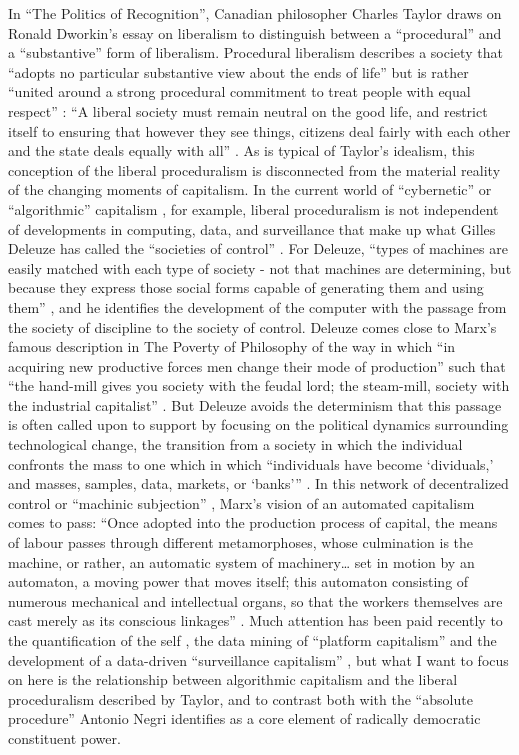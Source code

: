 \documentclass[12pt,oneside]{memoir}
\begin{document}
In ``The Politics of Recognition'', Canadian philosopher Charles Taylor draws on Ronald Dworkin's essay on liberalism to distinguish between a ``procedural'' and a ``substantive'' form of liberalism. Procedural liberalism describes a society that ``adopts no particular substantive view about the ends of life'' but is rather ``united around a strong procedural commitment to treat people with equal respect'' \cite[56]{Taylor1994}: ``A liberal society must remain neutral on the good life, and restrict itself to ensuring that however they see things, citizens deal fairly with each other and the state deals equally with all'' \citep[57]{Taylor1994}. As is typical of Taylor's idealism, this conception of the liberal proceduralism is disconnected from the material reality of the changing moments of capitalism. In the current world of ``cybernetic'' or ``algorithmic'' capitalism \citep{DyerWitheford2015, Parisi2015}, for example, liberal proceduralism is not independent of developments in computing, data, and surveillance that make up what Gilles Deleuze has called the ``societies of control'' \citep{Deleuze1992}. For Deleuze, ``types of machines are easily matched with each type of society - not that machines are determining, but because they express those social forms capable of generating them and using them'' \citep[6]{Deleuze1992}, and he identifies the development of the computer with the passage from the society of discipline to the society of control. Deleuze comes close to Marx's famous description in The Poverty of Philosophy of the way in which ``in acquiring new productive forces men change their mode of production'' such that ``the hand-mill gives you society with the feudal lord; the steam-mill, society with the industrial capitalist'' \citep[95]{Marx1955}. But Deleuze avoids the determinism that this passage is often called upon to support by focusing on the political dynamics surrounding technological change, the transition from a society in which the individual confronts the mass to one which in which ``individuals have become `dividuals,' and masses, samples, data, markets, or `banks''' \citep[5]{Deleuze1992}. In this network of decentralized control or ``machinic  subjection'' \citep{Lazzarato2012}, Marx's vision of an automated capitalism comes to pass: ``Once adopted into the production process of capital, the means of labour passes through different metamorphoses, whose culmination is the machine, or rather, an automatic system of machinery{\ldots} set in motion by an automaton, a moving power that moves itself; this automaton consisting of numerous mechanical and intellectual organs, so that the workers themselves are cast merely as its conscious linkages'' \citep[692]{Marx1973}. Much attention has been paid recently to the quantification of the self \citep{Moore2017}, the data mining of ``platform capitalism'' \citep{Srnicek2016} and the development of a data-driven ``surveillance capitalism'' \citep{Zuboff2019}, but what I want to focus on here is the relationship between algorithmic capitalism and the liberal proceduralism described by Taylor, and to contrast both with the ``absolute procedure'' Antonio Negri identifies as a core element of radically democratic constituent power. 
	
\end{document}
